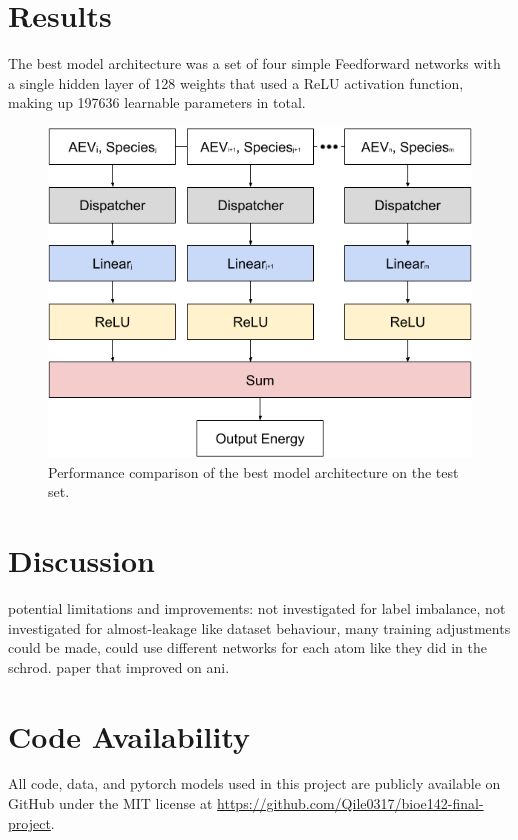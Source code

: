 \section{Results}

The best model architecture was a set of four simple Feedforward networks with a single hidden layer of 128 weights that used a ReLU activation function, making up 197636 learnable parameters in total.

\begin{figure}[h]
    \centering
    \includegraphics{figures/bioe142.png}
    \caption{Performance comparison of the best model architecture on the test set.}
    \label{fig:performance_comparison}
\end{figure}

\section{Discussion}
\lipsum[5]

potential limitations and improvements: not investigated for label imbalance, not investigated for almost-leakage like dataset behaviour, many training adjustments could be made, could use different networks for each atom like they did in the schrod. paper that improved on ani.

\section{Code Availability}

All code, data, and pytorch models used in this project are publicly available on GitHub under the MIT license at \url{https://github.com/Qile0317/bioe142-final-project}.

\printbibliography[heading=bibnumbered]
